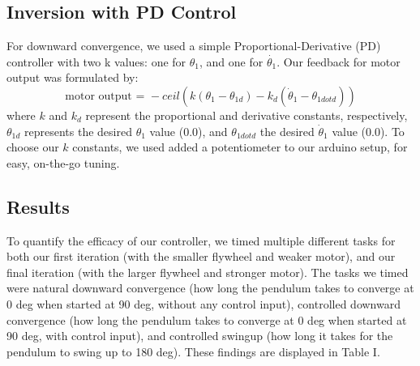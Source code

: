 \documentclass[conference]{IEEEtran}
\begin{document}
\subsection{Inversion with PD Control}
For downward convergence, we used a simple Proportional-Derivative (PD) controller with two k values: one for $\theta_1$, and one for $\dot{\theta_1}$. Our feedback for motor output was formulated by: $$\textrm{motor output = } - ceil(k(\theta_1-\theta_{1d})-k_d (\dot{\theta}_1-\theta_{1dotd}))$$ where $k$ and $k_d$ represent the proportional and derivative constants, respectively, $\theta_{1d}$ represents the desired $\theta_1$ value (0.0), and $\theta_{1dotd}$ the desired $\dot{\theta}_1$ value (0.0). To choose our $k$ constants, we used added a potentiometer to our arduino setup, for easy, on-the-go tuning. 

\subsection{Results}
To quantify the efficacy of our controller, we timed multiple different tasks for both our first iteration (with the smaller flywheel and weaker motor), and our final iteration (with the larger flywheel and stronger motor). The tasks we timed were natural downward convergence (how long the pendulum takes to converge at 0 deg when started at 90 deg, without any control input), controlled downward convergence (how long the pendulum takes to converge at 0 deg when started at 90 deg, with control input), and controlled swingup (how long it takes for the pendulum to swing up to 180 deg). These findings are displayed in Table I.
\end{document}

